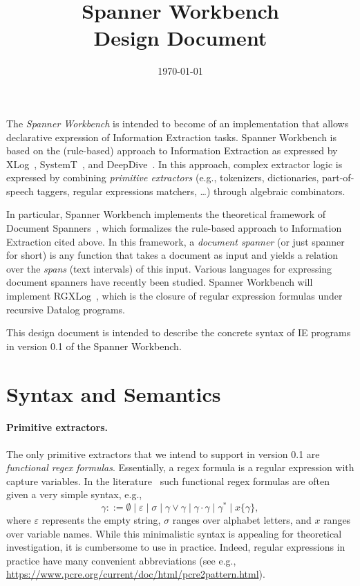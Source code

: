 \documentclass[a4paper,11pt,pdftex]{article}
\newcommand{\implname}{Spanner Workbench\xspace}
\newcommand{\ie}{IE\xspace}
\begin{document}
\title{\implname\\Design Document}
\date{\today}

\maketitle

The \emph{\implname} is intended to become of an implementation that allows
declarative expression of Information Extraction tasks. \implname is based on
the (rule-based) approach to Information Extraction as expressed by
XLog~\cite{?}, SystemT~\cite{?}, and DeepDive~\cite{?}. In this approach, complex extractor logic is expressed by combining \emph{primitive extractors} (e.g., tokenizers, dictionaries, part-of-speech taggers, regular expressions matchers, \dots) through algebraic combinators.

In particular, \implname implements the theoretical framework of Document
Spanners~\cite{?}, which formalizes the rule-based approach to Information
Extraction cited above. In this framework, a \emph{document spanner} (or just
spanner for short) is any function that takes a document as input and yields a
relation over the \emph{spans} (text intervals) of this input.  Various
languages for expressing document spanners have recently been studied. \implname
will implement \textsf{RGXLog}~\cite{?}, which is the closure of  regular expression formulas under recursive Datalog programs.

This design document is intended to describe the concrete syntax of \ie programs in version 0.1 of the \implname. 

\section{Syntax and Semantics}
\label{sec:syntax}

\paragraph*{Primitive extractors.} The only primitive extractors that we intend to support in version 0.1 are \emph{functional regex formulas}. Essentially, a regex formula is a regular expression with capture variables. In the literature~\cite{?} such functional regex formulas are often given a very simple syntax, e.g.,
\[ \gamma ::= \emptyset \mid \varepsilon \mid \sigma \mid \gamma \vee \gamma \mid \gamma \cdot \gamma \mid \gamma^* \mid x\{\gamma\},\]
where $\varepsilon$ represents the empty string, $\sigma$ ranges over alphabet letters, and $x$ ranges over variable names.
While this minimalistic syntax is appealing for theoretical investigation, it is
cumbersome to use in practice. Indeed, regular expressions in practice have many
convenient abbreviations (see e.g.,
\url{https://www.pcre.org/current/doc/html/pcre2pattern.html}).
\end{document}
